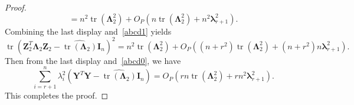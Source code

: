 \documentclass[12pt]{article} %
\DeclareMathOperator{\mytr}{tr}
\newcommand{\bZ}{\mathbf{Z}}
\newcommand{\bY}{\mathbf{Y}}
\newcommand{\bI}{\mathbf{I}}
\newcommand{\bfsym}[1]{\ensuremath{\boldsymbol{#1}}}
\def\blambda {\bfsym {\lambda}}
\def\bLambda {\bfsym {\Lambda}}
\theoremstyle{definition}
\begin{document}
\begin{appendices}
\begin{proof}
\begin{equation*}
            =
            n^2 \mytr(\bLambda_2^2)+O_P\left( n \mytr(\bLambda_2^2)+ n^{2}\blambda_{r+1}^2\right).
    \end{equation*}
    Combining the last display and~\eqref{abcd1} yields
    \begin{equation*}
        \mytr(\bZ_2^T \bLambda_2 \bZ_2-\widehat{\mytr(\bLambda_2)}\bI_n)^2
        =
        n^2 \mytr(\bLambda_2^2)+O_P\left( (n+r^2) \mytr(\bLambda_2^2)+ (n+r^2)n\blambda_{r+1}^2\right)
        .
    \end{equation*}
    Then from the last display and~\eqref{abcd0}, we have
    \begin{equation*}
            \sum_{i=r+1}^n \lambda_i^2\left(\bY^T \bY-\widehat{\mytr(\bLambda_2)}\bI_n\right)
            =
            O_P\left(rn \mytr(\bLambda_2^2) + r n^2 \blambda_{r+1}^2\right).
    \end{equation*}
    This completes the proof.

\end{proof}




\end{appendices}
\end{document}
